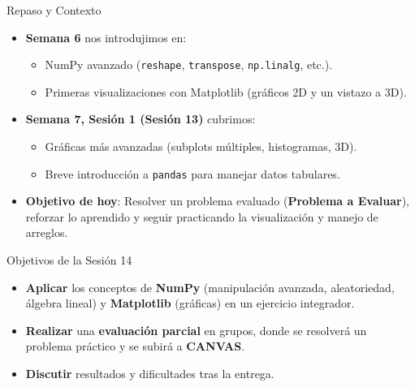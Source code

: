 \documentclass[10pt]{beamer}
\begin{document}
\begin{frame}{Repaso y Contexto}
  \begin{itemize}
    \item \textbf{Semana 6} nos introdujimos en:
      \begin{itemize}
        \item NumPy avanzado (\texttt{reshape}, \texttt{transpose}, \texttt{np.linalg}, etc.).
        \item Primeras visualizaciones con Matplotlib (gráficos 2D y un vistazo a 3D).
      \end{itemize}
    \item \textbf{Semana 7, Sesión 1 (Sesión 13)} cubrimos:
      \begin{itemize}
        \item Gráficas más avanzadas (subplots múltiples, histogramas, 3D).
        \item Breve introducción a \texttt{pandas} para manejar datos tabulares.
      \end{itemize}
    \item \textbf{Objetivo de hoy}: Resolver un problema evaluado (\textbf{Problema a Evaluar}), reforzar lo aprendido y seguir practicando la visualización y manejo de arreglos.
  \end{itemize}
\end{frame}

\begin{frame}{Objetivos de la Sesión 14}
  \begin{itemize}
    \item \textbf{Aplicar} los conceptos de \textbf{NumPy} (manipulación avanzada, aleatoriedad, álgebra lineal) y \textbf{Matplotlib} (gráficas) en un ejercicio integrador.
    \item \textbf{Realizar} una \textbf{evaluación parcial} en grupos, donde se resolverá un problema práctico y se subirá a \textbf{CANVAS}.
    \item \textbf{Discutir} resultados y dificultades tras la entrega.
  \end{itemize}
\end{frame}
\end{document}
